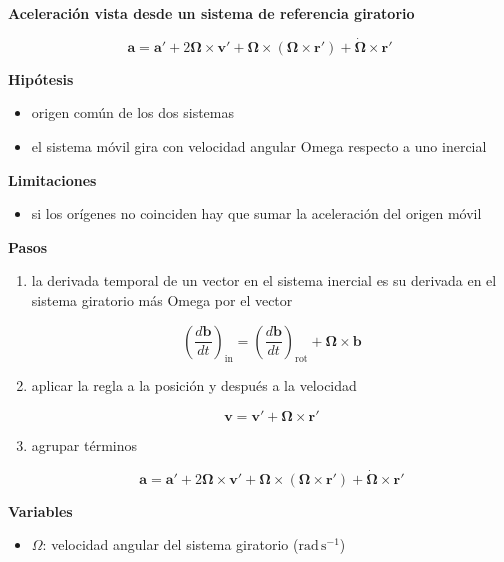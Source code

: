 \documentclass[10pt,openany]{book}
\begin{document}
\begin{tcolorbox}[title={Desarrollos del modelo}, studiumdef, breakable]

\noindent\textbf{Aceleración vista desde un sistema de referencia giratorio}

\begin{equation}
\mathbf{a} = \mathbf{a}' + 2\boldsymbol{\Omega}\times\mathbf{v}' + \boldsymbol{\Omega}\times\left(\boldsymbol{\Omega}\times\mathbf{r}'\right) + \dot{\boldsymbol{\Omega}}\times\mathbf{r}'
\label{eq:c02-giratorio}
\end{equation}

\noindent\textbf{Hipótesis}
\begin{itemize}
\item origen común de los dos sistemas
\item el sistema móvil gira con velocidad angular Omega respecto a uno inercial
\end{itemize}

\noindent\textbf{Limitaciones}
\begin{itemize}
\item si los orígenes no coinciden hay que sumar la aceleración del origen móvil
\end{itemize}

\noindent\textbf{Pasos}
\begin{enumerate}
\item
la derivada temporal de un vector en el sistema inercial es su derivada en el sistema giratorio más Omega por el vector

\[
\left(\frac{d\mathbf{b}}{dt}\right)_{\mathrm{in}} = \left(\frac{d\mathbf{b}}{dt}\right)_{\mathrm{rot}} + \boldsymbol{\Omega}\times\mathbf{b}
\]
\item
aplicar la regla a la posición y después a la velocidad

\[
\mathbf{v} = \mathbf{v}' + \boldsymbol{\Omega}\times\mathbf{r}'
\]
\item
agrupar términos

\[
\mathbf{a} = \mathbf{a}' + 2\boldsymbol{\Omega}\times\mathbf{v}' + \boldsymbol{\Omega}\times(\boldsymbol{\Omega}\times\mathbf{r}') + \dot{\boldsymbol{\Omega}}\times\mathbf{r}'
\]
\end{enumerate}

\noindent\textbf{Variables}
\begin{itemize}
\item $\Omega$: velocidad angular del sistema giratorio ($\mathrm{rad}\,\mathrm{s}^{-1}$)
\end{itemize}




\end{tcolorbox}
\end{document}

